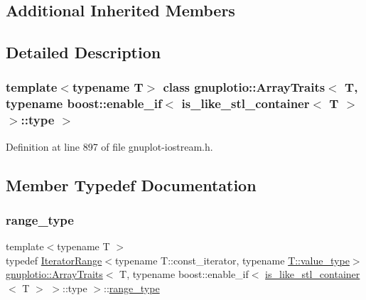 \subsection*{Additional Inherited Members}


\subsection{Detailed Description}
\subsubsection*{template$<$typename T$>$\newline
class gnuplotio\+::\+Array\+Traits$<$ T, typename boost\+::enable\+\_\+if$<$ is\+\_\+like\+\_\+stl\+\_\+container$<$ T $>$ $>$\+::type $>$}



Definition at line 897 of file gnuplot-\/iostream.\+h.



\subsection{Member Typedef Documentation}
\mbox{\label{classgnuplotio_1_1_array_traits_3_01_t_00_01typename_01boost_1_1enable__if_3_01is__like__stl__co9e1736bbd08cd58c6993ab613a998887_ab702072abbe018bbc90b9967ca8c4b42}} 
\subsubsection{\texorpdfstring{range\+\_\+type}{range\_type}}
{\footnotesize\ttfamily template$<$typename T $>$ \\
typedef \hyperlink{classgnuplotio_1_1_iterator_range}{Iterator\+Range}$<$typename T\+::const\+\_\+iterator, typename \hyperlink{classgnuplotio_1_1_array_traits_a3bcae12a7bf42af90f4946acc66f27e0}{T\+::value\+\_\+type}$>$ \hyperlink{classgnuplotio_1_1_array_traits}{gnuplotio\+::\+Array\+Traits}$<$ T, typename boost\+::enable\+\_\+if$<$ \hyperlink{structgnuplotio_1_1is__like__stl__container}{is\+\_\+like\+\_\+stl\+\_\+container}$<$ T $>$ $>$\+::type $>$\+::\hyperlink{classgnuplotio_1_1_array_traits_3_01_t_00_01typename_01boost_1_1enable__if_3_01is__like__stl__co9e1736bbd08cd58c6993ab613a998887_ab702072abbe018bbc90b9967ca8c4b42}{range\+\_\+type}}



